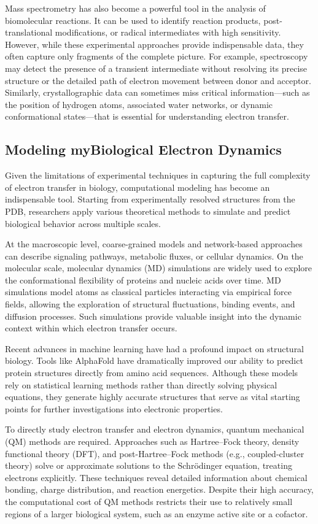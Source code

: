 Mass spectrometry has also become a powerful tool in the analysis of biomolecular reactions. It can be used to identify reaction products, post-translational modifications, or radical intermediates with high sensitivity. However, while these experimental approaches provide indispensable data, they often capture only fragments of the complete picture. For example, spectroscopy may detect the presence of a transient intermediate without resolving its precise structure or the detailed path of electron movement between donor and acceptor. Similarly, crystallographic data can sometimes miss critical information—such as the position of hydrogen atoms, associated water networks, or dynamic conformational states—that is essential for understanding electron transfer.

\subsection{Modeling myBiological Electron Dynamics}

Given the limitations of experimental techniques in capturing the full complexity of electron transfer in biology, computational modeling has become an indispensable tool. Starting from experimentally resolved structures from the PDB, researchers apply various theoretical methods to simulate and predict biological behavior across multiple scales.

At the macroscopic level, coarse-grained models and network-based approaches can describe signaling pathways, metabolic fluxes, or cellular dynamics. On the molecular scale, molecular dynamics (MD) simulations are widely used to explore the conformational flexibility of proteins and nucleic acids over time. MD simulations model atoms as classical particles interacting via empirical force fields, allowing the exploration of structural fluctuations, binding events, and diffusion processes. Such simulations provide valuable insight into the dynamic context within which electron transfer occurs.

Recent advances in machine learning have had a profound impact on structural biology. Tools like AlphaFold have dramatically improved our ability to predict protein structures directly from amino acid sequences. Although these models rely on statistical learning methods rather than directly solving physical equations, they generate highly accurate structures that serve as vital starting points for further investigations into electronic properties.

To directly study electron transfer and electron dynamics, quantum mechanical (QM) methods are required. Approaches such as Hartree–Fock theory, density functional theory (DFT), and post-Hartree–Fock methods (e.g., coupled-cluster theory) solve or approximate solutions to the Schrödinger equation, treating electrons explicitly. These techniques reveal detailed information about chemical bonding, charge distribution, and reaction energetics. Despite their high accuracy, the computational cost of QM methods restricts their use to relatively small regions of a larger biological system, such as an enzyme active site or a cofactor.

